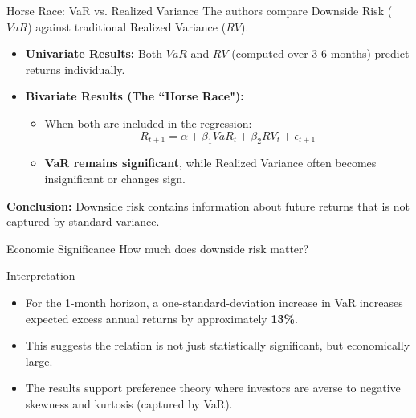 \documentclass{beamer}
\begin{document}
\begin{frame}{Horse Race: VaR vs. Realized Variance}
    The authors compare Downside Risk ($VaR$) against traditional Realized Variance ($RV$).

    \begin{itemize}
        \item \textbf{Univariate Results:} Both $VaR$ and $RV$ (computed over 3-6 months) predict returns individually.
        \item \textbf{Bivariate Results (The ``Horse Race"):}
            \begin{itemize}
                \item When both are included in the regression:
                $$ R_{t+1} = \alpha + \beta_1 VaR_t + \beta_2 RV_t + \epsilon_{t+1} $$
                \item \textbf{VaR remains significant}, while Realized Variance often becomes insignificant or changes sign.
            \end{itemize}
    \end{itemize}

    
    \textbf{Conclusion:} Downside risk contains information about future returns that is not captured by standard variance.
\end{frame}

\begin{frame}{Economic Significance}
    How much does downside risk matter?

    \begin{exampleblock}{Interpretation}
        \begin{itemize}
            \item For the 1-month horizon, a one-standard-deviation increase in VaR increases expected excess annual returns by approximately \textbf{13\%}.
            \item This suggests the relation is not just statistically significant, but economically large.
        \end{itemize}
    \end{exampleblock}
    
    \begin{itemize}
        \item The results support preference theory where investors are averse to negative skewness and kurtosis (captured by VaR).
    \end{itemize}
\end{frame}
\end{document}
